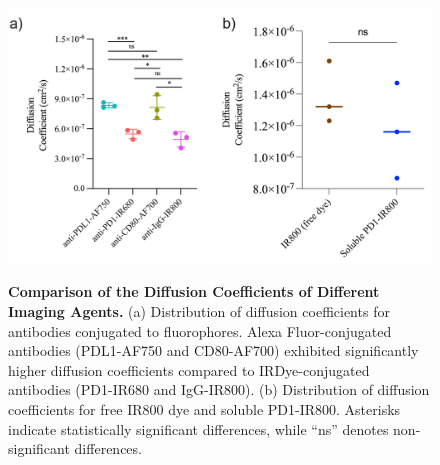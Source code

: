 \begin{figure}[H]
    \centering
    \begin{minipage}{0.85\linewidth}
        \centering
        \includegraphics[width=\linewidth]{figures/diffusion_plots.png}

        \begin{minipage}{0pt}
            \label{fig:diffusion_plot_a}
            \label{fig:diffusion_plot_b}
        \end{minipage}

        \captionsetup{justification=raggedright, singlelinecheck=false}
        \caption[Comparison of diffusion coefficients]{\textbf{Comparison of the Diffusion Coefficients of Different Imaging Agents.}
        (a) Distribution of diffusion coefficients for antibodies conjugated to fluorophores. Alexa Fluor-conjugated antibodies 
        (PDL1-AF750 and CD80-AF700) exhibited significantly higher diffusion coefficients compared to IRDye-conjugated antibodies (PD1-IR680 and 
        IgG-IR800). (b) Distribution of diffusion coefficients for free IR800 dye and soluble PD1-IR800. Asterisks indicate statistically significant 
        differences, while “ns” denotes non-significant differences.}
        \label{fig:diffusion_plots}
    \end{minipage}
\end{figure}
